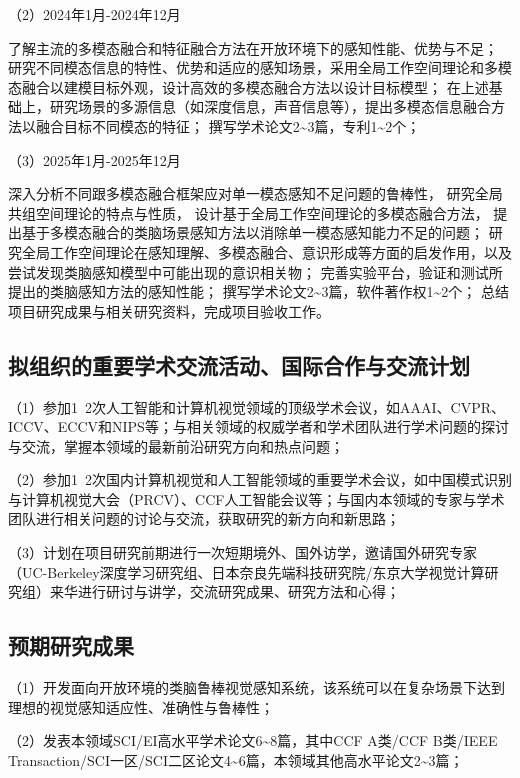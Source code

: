\documentclass[a4paper,zihao=-4]{article}
\begin{document}
（2）2024年1月-2024年12月

了解主流的多模态融合和特征融合方法在开放环境下的感知性能、优势与不足；
研究不同模态信息的特性、优势和适应的感知场景，采用全局工作空间理论和多模态融合以建模目标外观，设计高效的多模态融合方法以设计目标模型；
在上述基础上，研究场景的多源信息（如深度信息，声音信息等），提出多模态信息融合方法以融合目标不同模态的特征；
撰写学术论文2\textasciitilde3篇，专利1\textasciitilde2个；

（3）2025年1月-2025年12月

深入分析不同跟多模态融合框架应对单一模态感知不足问题的鲁棒性，
研究全局共组空间理论的特点与性质，
设计基于全局工作空间理论的多模态融合方法，
提出基于多模态融合的类脑场景感知方法以消除单一模态感知能力不足的问题；
研究全局工作空间理论在感知理解、多模态融合、意识形成等方面的启发作用，以及尝试发现类脑感知模型中可能出现的意识相关物；
完善实验平台，验证和测试所提出的类脑感知方法的感知性能；
撰写学术论文2\textasciitilde3篇，软件著作权1\textasciitilde2个；
总结项目研究成果与相关研究资料，完成项目验收工作。


\textcolor{NsfcBlue}{\subsection{拟组织的重要学术交流活动、国际合作与交流计划}}

（1）参加1~2次人工智能和计算机视觉领域的顶级学术会议，如AAAI、CVPR、ICCV、ECCV和NIPS等；与相关领域的权威学者和学术团队进行学术问题的探讨与交流，掌握本领域的最新前沿研究方向和热点问题；

（2）参加1~2次国内计算机视觉和人工智能领域的重要学术会议，如中国模式识别与计算机视觉大会（PRCV）、CCF人工智能会议等；与国内本领域的专家与学术团队进行相关问题的讨论与交流，获取研究的新方向和新思路；

（3）计划在项目研究前期进行一次短期境外、国外访学，邀请国外研究专家（UC-Berkeley深度学习研究组、日本奈良先端科技研究院/东京大学视觉计算研究组）来华进行研讨与讲学，交流研究成果、研究方法和心得；


\textcolor{NsfcBlue}{\subsection{预期研究成果}}
（1）开发面向开放环境的类脑鲁棒视觉感知系统，该系统可以在复杂场景下达到理想的视觉感知适应性、准确性与鲁棒性；

（2）发表本领域SCI/EI高水平学术论文6\textasciitilde8篇，其中CCF A类/CCF B类/IEEE Transaction/SCI一区/SCI二区论文4\textasciitilde6篇，本领域其他高水平论文2\textasciitilde3篇；
\end{document}
